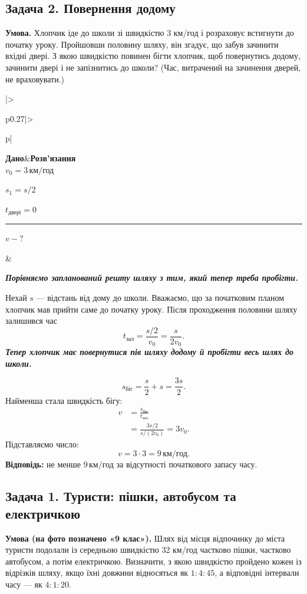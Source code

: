 \documentclass[12pt,a4paper]{article}
\newcommand{\target}[1]{\par\rule{\linewidth}{0.3pt}\par $#1-?$}
\newcommand{\why}[1]{\textbf{\textit{#1}}\par}
\newenvironment{solutiontwo}{\small\begin{tabular}{|>{\raggedright\arraybackslash}p{0.27\linewidth}|>{\raggedright\arraybackslash}p{\dimexpr0.73\linewidth-4\tabcolsep-3\arrayrulewidth\relax}|}\hline
\textbf{Дано}&\textbf{Розв'язання}\\\hline}{\\\hline\end{tabular}\par}
\begin{document}
\subsection*{Задача 2. Повернення додому}
\textbf{Умова.} Хлопчик іде до школи зі швидкістю 3 км/год і розраховує встигнути до початку уроку. Пройшовши половину шляху, він згадує, що забув зачинити вхідні двері. З якою швидкістю повинен бігти хлопчик, щоб повернутись додому, зачинити двері і не запізнитись до школи? (Час, витрачений на зачинення дверей, не враховувати.)

\begin{solutiontwo}
$v_0=3\,\text{км/год}$\par
$s_1=s/2$\par
$t_{\text{двері}}=0$
\target{v}

&

\why{Порівняємо запланований решту шляху з тим, який тепер треба пробігти.}
Нехай $s$ --- відстань від дому до школи. Вважаємо, що за початковим планом хлопчик мав прийти саме до початку уроку.
Після проходження половини шляху залишився час
\[t_{\text{зал}}=\frac{s/2}{v_0}=\frac{s}{2v_0}.\]
\why{Тепер хлопчик має повернутися пів шляху додому й пробігти весь шлях до школи.}
\[s_{\text{біг}}=\frac{s}{2}+s=\frac{3s}{2}.\]
Найменша стала швидкість бігу:
\[
\begin{aligned}
v&=\frac{s_{\text{біг}}}{t_{\text{зал}}}\\
&=\frac{3s/2}{s/(2v_0)}=3v_0.
\end{aligned}
\]
Підставляємо число:
\[v=3\cdot3=9\,\text{км/год}.\]
\textbf{Відповідь:} не менше $9\,\text{км/год}$ за відсутності початкового запасу часу.
\end{solutiontwo}
\newpage
\subsection*{Задача 1. Туристи: пішки, автобусом та електричкою}
\textbf{Умова (на фото позначено «9 клас»).} Шлях від місця відпочинку до міста туристи подолали із середньою швидкістю 32 км/год частково пішки, частково автобусом, а потім електричкою. Визначити, з якою швидкістю пройдено кожен із відрізків шляху, якщо їхні довжини відносяться як $1:4:45$, а відповідні інтервали часу --- як $4:1:20$.
\end{document}
